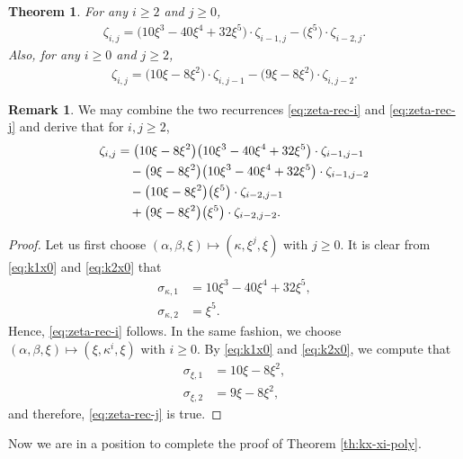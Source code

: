 \documentclass[12pt,reqno]{amsart}
\numberwithin{equation}{section}
\theoremstyle{theorem}
\newtheorem{theorem}{Theorem}
\theoremstyle{definition}
\newtheorem{remark}{Remark}
\begin{document}
\begin{theorem}
	For any $i\ge 2$ and $j\ge 0$,
	\begin{align}\label{eq:zeta-rec-i}
		\zeta_{i,j} = \big(10 \xi^3 - 40 \xi^4 + 32 \xi^5\big)\cdot \zeta_{i-1,j} - \big(\xi^5\big)\cdot \zeta_{i-2,j}.
	\end{align}
	Also, for any $i\ge 0$ and $j\ge 2$,
	\begin{align}\label{eq:zeta-rec-j}
		\zeta_{i,j} = \big(10 \xi - 8 \xi^2\big)\cdot \zeta_{i,j-1} - \big(9 \xi - 8 \xi^2\big)\cdot \zeta_{i,j-2}.
	\end{align}
\end{theorem}

\begin{remark}
	We may combine the two recurrences \eqref{eq:zeta-rec-i} and \eqref{eq:zeta-rec-j} and derive that for $i,j\ge 2$,
	\begin{align}
		\zeta_{i,j} &= \big(10 \xi - 8 \xi^2\big)\big(10 \xi^3 - 40 \xi^4 + 32 \xi^5\big) \cdot \zeta_{i-1,j-1}\notag\\
		&\quad - \big(9 \xi - 8 \xi^2\big)\big(10 \xi^3 - 40 \xi^4 + 32 \xi^5\big) \cdot \zeta_{i-1,j-2}\notag\\
		&\quad - \big(10 \xi - 8 \xi^2\big)\big(\xi^5\big)\cdot \zeta_{i-2,j-1}\notag\\
		&\quad + \big(9 \xi - 8 \xi^2\big)\big(\xi^5\big)\cdot \zeta_{i-2,j-2}.
	\end{align}
\end{remark}

\begin{proof}
	Let us first choose $(\alpha,\beta,\xi)\mapsto (\kappa,\xi^j,\xi)$ with $j\ge 0$. It is clear from \eqref{eq:k1x0} and \eqref{eq:k2x0} that
	\begin{align*}
		\sigma_{\kappa,1}&= 10 \xi^3 - 40 \xi^4 + 32 \xi^5,\\
		\sigma_{\kappa,2}&= \xi^5.
	\end{align*}
	Hence, \eqref{eq:zeta-rec-i} follows. In the same fashion, we choose $(\alpha,\beta,\xi)\mapsto (\xi,\kappa^i,\xi)$ with $i\ge 0$. By \eqref{eq:k1x0} and \eqref{eq:k2x0}, we compute that
	\begin{align*}
		\sigma_{\xi,1}&= 10 \xi - 8 \xi^2,\\
		\sigma_{\xi,2}&= 9 \xi - 8 \xi^2,
	\end{align*}
	and therefore, \eqref{eq:zeta-rec-j} is true.
\end{proof}

Now we are in a position to complete the proof of Theorem \ref{th:kx-xi-poly}.
\end{document}

